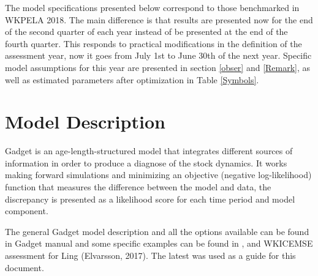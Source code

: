 \documentclass[review]{elsarticle}
\begin{document}
The model specifications presented below correspond to those benchmarked in WKPELA 2018. The main difference is that results are presented now for the end of the second quarter of each year instead of be presented at the end of the fourth quarter. This responds to practical modifications in the definition of the assessment year, now it goes from July 1st to June 30th of the next year. Specific model assumptions for this year are presented in section \ref{obser} and \ref{Remark}, as well as estimated parameters after optimization in Table \ref{Symbols}.


\section{Model Description}







 
 
 Gadget is an age-length-structured model that integrates different sources of information in order to produce a diagnose of the stock dynamics.  It works making forward simulations and minimizing an objective (negative log-likelihood) function that measures the difference between the model and data, the discrepancy is presented as a likelihood score for each time period and model component.%
 
 
 

 
 The general Gadget model description and all the options available can be found in Gadget manual \citep{begley_gadget_2004} and some specific examples can be found in \citet{taylor_simple_2007}, \citet{elvarsson_bootstrap_2014} and WKICEMSE assessment for Ling (Elvarsson, 2017).  The latest was used as a guide for this document.
 
\end{document}
